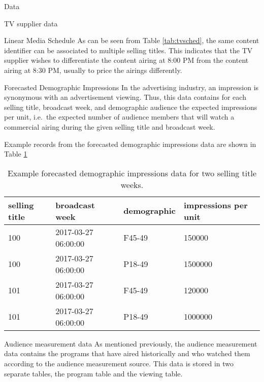 \begin{chapter}{Data}
\begin{section}{TV supplier data}
\begin{subsection}{Linear Media Schedule}
    As can be seen from Table \ref{tab:tvsched}, the same content identifier can be associated
    to multiple selling titles. This indicates that the TV supplier wishes to differentiate
    the content airing at 8:00 PM from the content airing at 8:30 PM, usually to price the airings differently.

  \end{subsection}

  \begin{subsection}{Forecasted Demographic Impressions}
    In the advertising industry, an impression is synonymous with an advertisement viewing.
    Thus, this data contains for each selling title, broadcast week, and demographic audience the expected impressions per unit, i.e.\
    the expected number of audience members that will watch a commercial airing during the given selling title and broadcast week.

    Example records from the forecasted demographic impressions data are shown in Table \ref{tab:tvdem}

    \begin{table}[h!]
      \centering
        \begin{tabular}{llll}
          selling title & broadcast week & demographic & impressions per unit \\
          \hline
          100 & 2017-03-27 06:00:00 & F45-49 & 150000 \\
          100 & 2017-03-27 06:00:00 & P18-49 & 1500000 \\
          101 & 2017-03-27 06:00:00 & F45-49 & 120000 \\
          101 & 2017-03-27 06:00:00 & P18-49 & 1000000 \\
        \end{tabular}
      \caption{Example forecasted demographic impressions data for two selling title weeks.}\label{tab:tvdem}
    \end{table}
  \end{subsection}
\end{section}


\begin{section}{Audience measurement data}
  As mentioned previously, the audience measurement data contains the programs that
  have aired historically and who watched them according to the audience measurement source.
  This data is stored in two separate tables, the program table and the viewing table.


\end{section}
\end{chapter}
